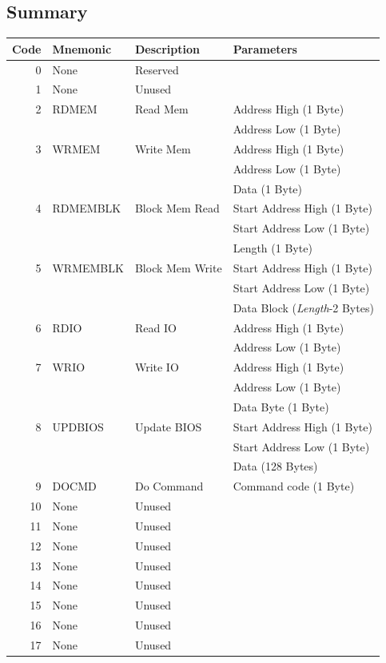 \documentclass[a4paper,10pt]{book}
\begin{document}
\subsection{Summary}
\begin{tabular}{|r|l|p{3cm}|p{4.5cm}|}
\hline
 \textbf{Code}&\textbf{Mnemonic}&\textbf{Description}&\textbf{Parameters}\\
\hline
 0&None&Reserved&\\
\hline
 1&None&Unused&\\
\hline
 2&RDMEM&Read Mem&Address High (1 Byte)\\
&&&Address Low (1 Byte)\\
\hline
 3&WRMEM&Write Mem&Address High (1 Byte)\\
&&&Address Low (1 Byte)\\
&&&Data (1 Byte)\\
\hline
 4&RDMEMBLK&Block Mem Read&Start Address High (1 Byte)\\
&&&Start Address Low (1 Byte)\\
&&&Length (1 Byte)\\
\hline
 5&WRMEMBLK&Block Mem Write&Start Address High (1 Byte)\\
&&&Start Address Low (1 Byte)\\
&&&Data Block (\textit{Length}-2 Bytes)\\
\hline
 6&RDIO&Read IO&Address High (1 Byte)\\
&&&Address Low (1 Byte)\\
\hline
 7&WRIO&Write IO&Address High (1 Byte)\\
&&&Address Low (1 Byte)\\
&&&Data Byte (1 Byte)\\
\hline
 8&UPDBIOS&Update BIOS&Start Address High (1 Byte)\\
&&&Start Address Low (1 Byte)\\
&&&Data (128 Bytes)\\ 
\hline
 9&DOCMD&Do Command&Command code (1 Byte)\\
\hline
 10&None&Unused&\\
\hline
 11&None&Unused&\\
\hline
 12&None&Unused&\\
\hline
 13&None&Unused&\\
\hline
 14&None&Unused&\\
\hline
 15&None&Unused&\\
\hline
 16&None&Unused&\\
\hline
 17&None&Unused&\\

\end{tabular}
\end{document}
